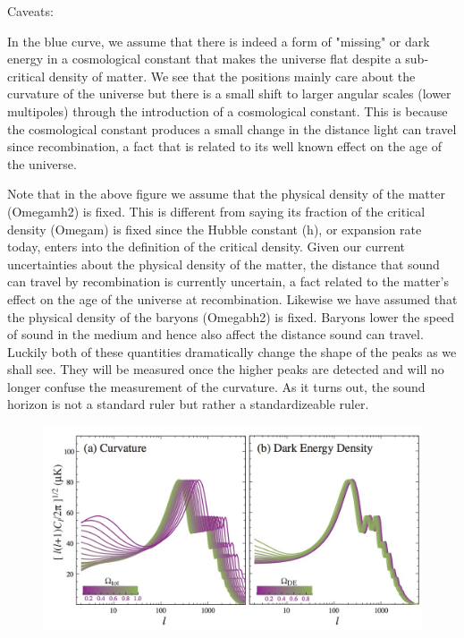 \documentclass{article}
\begin{document}
Caveats:

In the blue curve, we assume that there is indeed a form of "missing" or dark energy in a cosmological constant that makes the universe flat despite a sub-critical density of matter.  We see that the positions mainly care about the curvature of the universe but there is a small shift to larger angular scales (lower multipoles) through the introduction of a cosmological constant.  This is because the cosmological constant produces a small change in the distance light can travel since recombination, a fact that is related to its well known effect on the age of the universe. 

Note that in the above figure we assume that the physical density of the matter (Omegamh2) is fixed.  This is different from saying its fraction of the critical density (Omegam) is fixed since the Hubble constant (h), or expansion rate today, enters into the definition of the critical density.  Given our current uncertainties about the physical density of the matter, the distance that sound can travel by recombination is currently uncertain, a fact related to the matter's effect on the age of the universe at recombination.  Likewise we have assumed that the physical density of the baryons  (Omegabh2) is fixed.  Baryons lower the speed of sound in the medium and hence also affect the distance sound can travel.  Luckily both of these quantities dramatically change the shape of the peaks as we shall see.  They will be measured once the higher peaks are detected and will no longer confuse the measurement of the curvature.   As it turns out, the sound horizon is not a standard ruler but rather a standardizeable ruler.
\begin{figure}
\begin{center}
\includegraphics[width=\textwidth]{curvature_de}
\caption{}

\end{center}
\label{DE_curv}
\end{figure}
\end{document}
